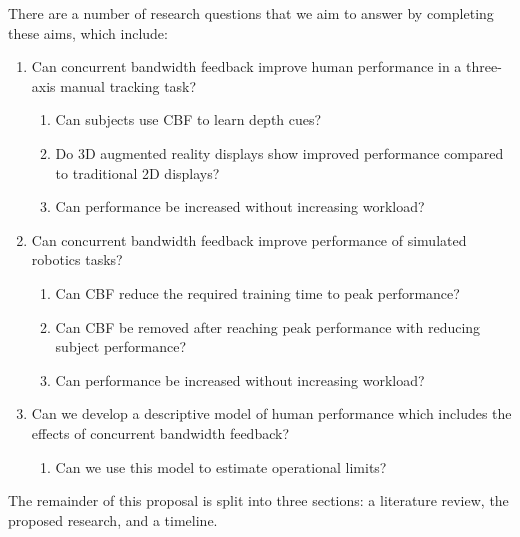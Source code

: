 \documentclass[float=false, crop=false]{standalone}
\begin{document}
There are a number of research questions that we aim to answer by completing these aims, which include:
\begin{enumerate}
\item Can concurrent bandwidth feedback improve human performance in a three-axis manual tracking task?
\begin{enumerate}
\item Can subjects use CBF to learn depth cues?
\item Do 3D augmented reality displays show improved performance compared to traditional 2D displays?
\item Can performance be increased without increasing workload?
\end{enumerate}
\item Can concurrent bandwidth feedback improve performance of simulated robotics tasks?
\begin{enumerate}
\item Can CBF reduce the required training time to peak performance?
\item Can CBF be removed after reaching peak performance with reducing subject performance?
\item Can performance be increased without increasing workload?
\end{enumerate}
\item Can we develop a descriptive model of human performance which includes the effects of concurrent bandwidth feedback?
\begin{enumerate}
\item Can we use this model to estimate operational limits?
\end{enumerate}
\end{enumerate}

The remainder of this proposal is split into three sections: a literature review, the proposed research, and a timeline.
\end{document}
